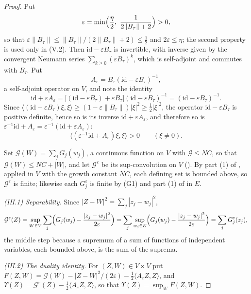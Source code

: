 \begin{proof}
Put
\[
  \varepsilon=\min\Bigl(\frac{\eta}{2},\ \frac1{2\|B_\tau\|+2}\Bigr)>0,
\]
so that $\varepsilon\|B_\tau\|\le\|B_\tau\|/(2\|B_\tau\|+2)\le\tfrac12$ and
$2\varepsilon\le\eta$; the second property is used only in (V.2). Then
$\mathrm{id}-\varepsilon B_\tau$ is invertible, with inverse given by the
convergent Neumann series $\sum_{k\ge0}(\varepsilon B_\tau)^k$, which is
self-adjoint and commutes with $B_\tau$. Put
\[
  A_\varepsilon=B_\tau(\mathrm{id}-\varepsilon B_\tau)^{-1},
\]
a self-adjoint operator on $V$, and note the identity
\begin{equation}\label{eq:srj-resolvent}
  \mathrm{id}+\varepsilon A_\varepsilon
   =\bigl[(\mathrm{id}-\varepsilon B_\tau)+\varepsilon B_\tau\bigr]
     (\mathrm{id}-\varepsilon B_\tau)^{-1}
   =(\mathrm{id}-\varepsilon B_\tau)^{-1}.
\end{equation}
Since $\langle(\mathrm{id}-\varepsilon B_\tau)\xi,\xi\rangle
\ge(1-\varepsilon\|B_\tau\|)|\xi|^2\ge\tfrac12|\xi|^2$, the operator
$\mathrm{id}-\varepsilon B_\tau$ is positive definite, hence so is its inverse
$\mathrm{id}+\varepsilon A_\varepsilon$, and therefore so is
$\varepsilon^{-1}\mathrm{id}+A_\varepsilon
=\varepsilon^{-1}(\mathrm{id}+\varepsilon A_\varepsilon)$:
\begin{equation}\label{eq:srj-posdef}
  \bigl\langle(\varepsilon^{-1}\mathrm{id}+A_\varepsilon)\xi,\xi\bigr\rangle>0
  \qquad(\xi\ne0).
\end{equation}

Set $\mathcal G(W)=\sum_jG_j(w_j)$, a continuous function on $V$ with
$\mathcal G\le NC$, so that $\mathcal G(W)\le NC+|W|$, and let
$\mathcal G^\varepsilon$ be its sup-convolution on $V$
(). By part (1) of
, applied in $V$ with the growth constant
$NC$, each defining set is bounded above, so $\mathcal G^\varepsilon$ is finite;
likewise each $G_j^\varepsilon$ is finite by (G1) and part (1) of
 in $E$.

\emph{(III.1) Separability.}
Since $|Z-W|^2=\sum_j|z_j-w_j|^2$,
\[
  \mathcal G^\varepsilon(Z)
   =\sup_{W\in V}\sum_j\Bigl(G_j(w_j)-\frac{|z_j-w_j|^2}{2\varepsilon}\Bigr)
   =\sum_j\sup_{w_j\in E}\Bigl(G_j(w_j)-\frac{|z_j-w_j|^2}{2\varepsilon}\Bigr)
   =\sum_jG_j^\varepsilon(z_j),
\]
the middle step because a supremum of a sum of functions of independent
variables, each bounded above, is the sum of the suprema.

\emph{(III.2) The duality identity.}
For $(Z,W)\in V\times V$ put
$F(Z,W)=\mathcal G(W)-|Z-W|^2/(2\varepsilon)
-\tfrac12\langle A_\varepsilon Z,Z\rangle$, and
$\Upsilon(Z)=\mathcal G^\varepsilon(Z)-\tfrac12\langle A_\varepsilon Z,Z\rangle$,
so that $\Upsilon(Z)=\sup_WF(Z,W)$.


\end{proof}
